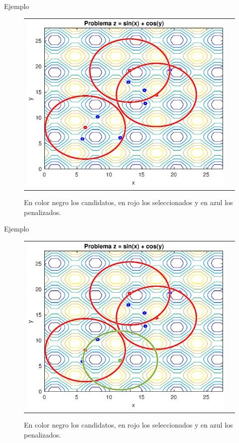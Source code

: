 \documentclass{beamer}
\begin{document}
\begin{frame}{Ejemplo}
\begin{figure}[H]
  \centering
  \begin{tabular}{c c}
   \includegraphics[scale=0.6]{Images/4.eps} 
  \end{tabular}
  \caption{\scriptsize En color negro los candidatos, en rojo los seleccionados y en azul los penalizados.}
\end{figure}
\end{frame}

\begin{frame}{Ejemplo}
\begin{figure}[H]
  \centering
  \begin{tabular}{c c}
   \includegraphics[scale=0.6]{Images/5.eps} 
  \end{tabular}
  \caption{\scriptsize En color negro los candidatos, en rojo los seleccionados y en azul los penalizados.}
\end{figure}
\end{frame}
\end{document}
